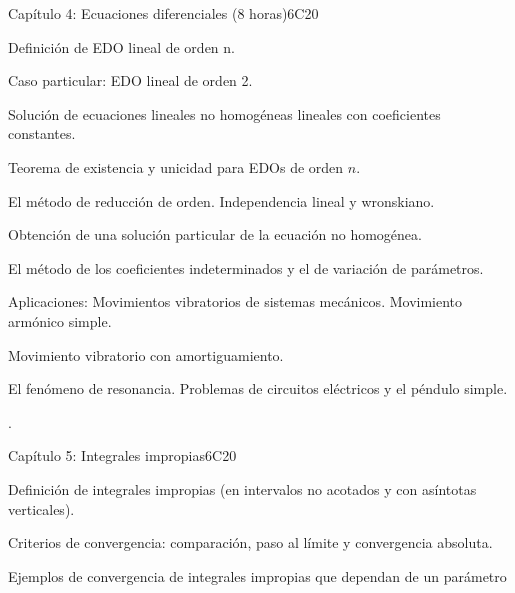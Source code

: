 \begin{syllabus}
\begin{unit}{Capítulo 4: Ecuaciones diferenciales (8 horas)}{}{}{6}{C20}


\begin{topics}
      \item Definición de EDO lineal de orden n. 
      \item Caso particular: EDO lineal de orden 2.
      \item Solución de ecuaciones lineales no homogéneas lineales con coeficientes constantes.
      \item Teorema de existencia y unicidad para EDOs de orden $n$.
      \item El método de reducción de orden. Independencia lineal y wronskiano.
      \item Obtención de una solución particular de la ecuación no homogénea.
      \item El método de los coeficientes indeterminados y el de variación de parámetros. 
      \item Aplicaciones: Movimientos vibratorios de sistemas mecánicos. Movimiento armónico simple. 
      \item  Movimiento vibratorio con amortiguamiento.
      \item El fenómeno de resonancia. Problemas de circuitos eléctricos y el péndulo simple.
   \end{topics}

   \begin{learningoutcomes}
      \item .
   \end{learningoutcomes}
\end{unit}

\begin{unit}{Capítulo 5: Integrales impropias}{}{}{6}{C20}
\begin{topics}
	\item Definición de integrales impropias (en intervalos no acotados y con asíntotas verticales). 
    \item Criterios de convergencia: comparación, paso al límite y convergencia absoluta. 
    \item Ejemplos de convergencia de integrales impropias que dependan de un parámetro
   \end{topics}


\end{unit}
\end{syllabus}
